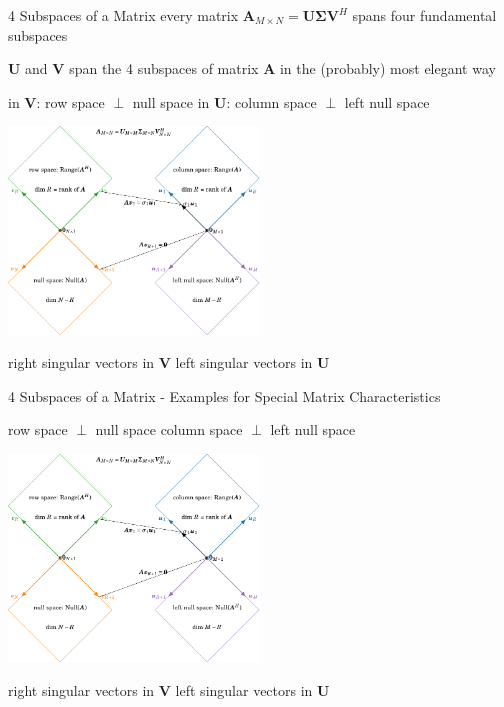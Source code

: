 \documentclass[mathserif, aspectratio=1610]{intbeamer}
\begin{document}
\begin{frame}{4 Subspaces of a Matrix}
%
every matrix $\bm{A}_{M \times N} = \bm{U} \bm{\Sigma} \bm{V}^H$ spans four fundamental subspaces

$\bm{U}$ and $\bm{V}$ span the 4 subspaces of matrix $\bm{A}$ in the (probably) most elegant way

\hspace{0.75cm}
in $\bm{V}$: \textcolor{C2}{row space} $\perp$ \textcolor{C1}{null space}
\hspace{2cm}
in $\bm{U}$: \textcolor{C0}{column space} $\perp$ \textcolor{C4}{left null space}

\centering
\includegraphics[width=0.5\textwidth]{four_subspaces.pdf}

\hspace{0.75cm}
right singular vectors in $\bm{V}$
\hspace{4.5cm}
left singular vectors in $\bm{U}$

\end{frame}






\begin{frame}[label=SubspacesForSketch, t]{4 Subspaces of a Matrix - Examples for Special Matrix Characteristics}

\hspace{-0.5cm}
\textcolor{C2}{row space} $\perp$ \textcolor{C1}{null space}
\hspace{0.5cm}
\textcolor{C0}{column space} $\perp$ \textcolor{C4}{left null space}

\begin{flushleft}
\includegraphics[width=0.5\textwidth]{four_subspaces.pdf}
\end{flushleft}

\hspace{-0.5cm}
right singular vectors in $\bm{V}$
\hspace{0.5cm}
left singular vectors in $\bm{U}$

\end{frame}
\end{document}
